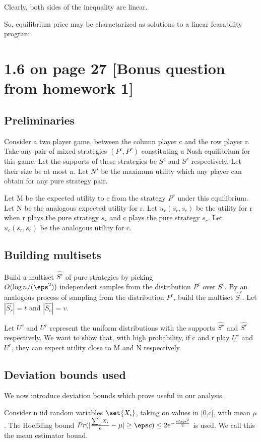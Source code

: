 \documentclass[10pt]{amsart}
\begin{document}
Clearly, both sides of the inequality are linear.

So, equilibrium price may be charactarized as solutions to a linear feasability program.

\section{1.6 on page 27 [Bonus question from homework 1]}
\subsection{Preliminaries}
Consider a two player game, between the column player c and the row player r. Take any pair of mixed strategies $(P^{c}, P^{r})$ constituting a Nash equilibrium for this game. Let the supports of these strategies be $S^{c}$ and $S^{r}$ respectively. Let their size be at most n. Let $N'$ be the maximum utility which any player can obtain for any pure strategy pair.

Let M be the expected utility to c from the strategy $P^{c}$ under this equilibrium. Let N be the analogous expected utility for r. Let $u_{r}(s_{r}, s_{c})$ be the utility for r when r plays the pure strategy $s_{r}$ and c plays the pure strategy $s_{c}$. Let $u_{c}(s_{r}, s_{c})$ be the analogous utility for c.

\subsection{Building multisets}
Build a multiset $\hat{S^{c}}$ of pure strategies by picking \\
$O(\log n / (\eps^2))$ independent samples from the distribution $P^{c}$ over $S^{c}$. By an analogous process of sampling from the distribution $P^{r}$, build the multiset $\hat{S}^{r}$. Let $|\hat{S_{r}}| = t$ and  $|\hat{S_{c}}| = v$.

Let $U^{c}$ and $U^{r}$ represent the uniform distributions with the supports $\hat{S^{c}}$ and $\hat{S^{r}}$ respectively. We want to show that, with high probability, if c and r play $U^{c}$ and $U^{r}$, they can expect utility close to M and N respectively.

\subsection{Deviation bounds used}
We now introduce deviation bounds which prove useful in our analysis.

Consider n iid random variables $\set{X_{i}}$, taking on values in [0,c], with mean $\mu$. The Hoeffding bound $Pr(|\frac{\sum_{i}X_{i}}{n} - \mu| \geq \eps c)\leq 2e^{-\frac{n\eps^{2}}{2}}$ is used. We call this the mean estimator bound.
\end{document}
